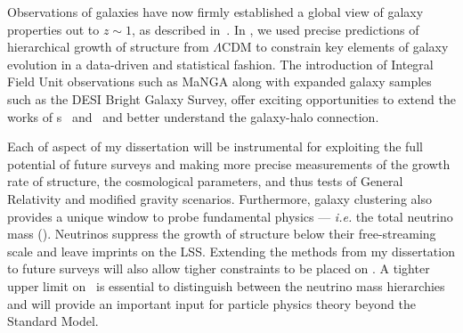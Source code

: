 
Observations of galaxies have now firmly established a global view of galaxy 
properties out to $z{\sim}1$, as described in~. In , 
we used precise predictions of hierarchical growth of structure from $\Lambda$CDM
to constrain key elements of galaxy evolution in a data-driven and statistical 
fashion. The introduction of Integral Field Unit observations such as MaNGA along 
with expanded galaxy samples such as the DESI Bright Galaxy Survey, offer exciting 
opportunities to extend the works of \chapname s~ and~
and better understand the galaxy-halo connection.

Each of aspect of my dissertation will be instrumental for exploiting the full 
potential of future surveys and making more precise measurements of the growth
rate of structure, the cosmological parameters, and thus tests of General Relativity 
and modified gravity scenarios. 
Furthermore, galaxy clustering also provides a unique window to probe 
fundamental physics --- {\em i.e.} the total neutrino mass (\mneut). Neutrinos 
suppress the growth of structure below their free-streaming scale and leave 
imprints on the LSS. Extending the methods from my dissertation to future 
surveys will also allow tigher constraints to be placed on \mneut. A tighter 
upper limit on \mneut ~is essential to distinguish between the neutrino mass 
hierarchies and will provide an important input for particle physics theory 
beyond the Standard Model.



